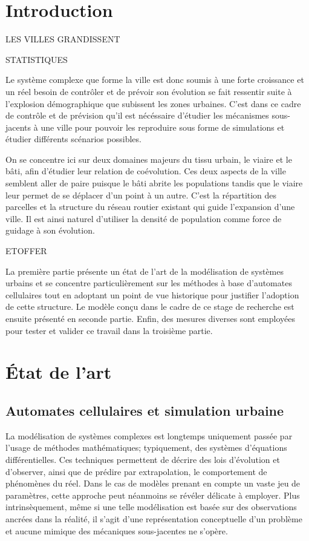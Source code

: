 \documentclass[12pt]{article}
\begin{document}
\section{Introduction}

LES VILLES GRANDISSENT

STATISTIQUES

Le système complexe que forme la ville est donc soumis à une forte
croissance et un réel besoin de contrôler et de prévoir son évolution
se fait ressentir suite à l'explosion démographique que subissent les
zones urbaines. C'est dans ce cadre de contrôle et de prévision qu'il
est nécéssaire d'étudier les mécanismes sous-jacents à une ville pour
pouvoir les reproduire sous forme de simulations et étudier différents
scénarios possibles.

On se concentre ici sur deux domaines majeurs du tissu urbain, le
viaire et le bâti, afin d'étudier leur relation de coévolution. Ces
deux aspects de la ville semblent aller de paire puisque le bâti
abrite les populations tandis que le viaire leur permet de se déplacer
d'un point à un autre. C'est la répartition des parcelles et la
structure du réseau routier existant qui guide l'expansion d'une
ville. Il est ainsi naturel d'utiliser la densité de population comme
force de guidage à son évolution.

ETOFFER

La première partie présente un état de l'art de la modélisation de
systèmes urbains et se concentre particulièrement sur les méthodes à
base d'automates cellulaires tout en adoptant un point de vue
historique pour justifier l'adoption de cette structure. Le modèle
conçu dans le cadre de ce stage de recherche est ensuite présenté en
seconde partie. Enfin, des mesures diverses sont employées pour tester
et valider ce travail dans la troisième partie.

\section{\'Etat de l'art}

\subsection{Automates cellulaires et simulation urbaine}

La modélisation de systèmes complexes est longtemps uniquement passée
par l'usage de méthodes mathématiques; typiquement, des systèmes
d'équations différentielles. Ces techniques permettent de décrire des
lois d'évolution et d'observer, ainsi que de prédire par
extrapolation, le comportement de phénomènes du réel. Dans le cas de
modèles prenant en compte un vaste jeu de paramètres, cette approche
peut néanmoins se révéler délicate à employer. Plus intrinsèquement,
même si une telle modélisation est basée sur des observations ancrées
dans la réalité, il s'agit d'une représentation conceptuelle d'un
problème et aucune mimique des mécaniques sous-jacentes ne s'opère.
\end{document}
